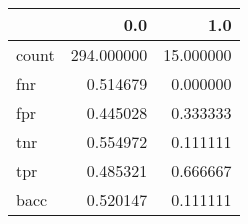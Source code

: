 \begin{tabular}{lrr}
\toprule
{} &         0.0 &        1.0 \\
\midrule
count &  294.000000 &  15.000000 \\
fnr   &    0.514679 &   0.000000 \\
fpr   &    0.445028 &   0.333333 \\
tnr   &    0.554972 &   0.111111 \\
tpr   &    0.485321 &   0.666667 \\
bacc  &    0.520147 &   0.111111 \\
\bottomrule
\end{tabular}
